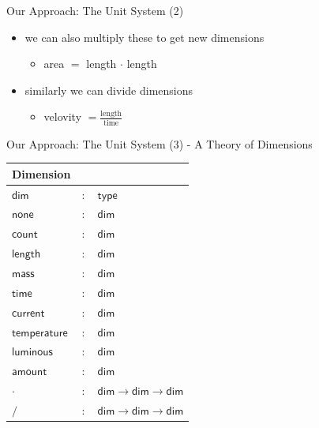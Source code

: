 \documentclass{beamer}
\begin{document}
  \begin{frame}{Our Approach: The Unit System (2)}
    \begin{itemize}[<+->]

      \item we can also multiply these to get new dimensions
      \begin{itemize}
        \item area $=$ length $\cdot{}$ length
      \end{itemize}

      \item similarly we can divide dimensions
      \begin{itemize}
        \item velovity $= \frac{\text{length}}{\text{time}}$
      \end{itemize}
    \end{itemize}
  \end{frame}
  \begin{frame}{Our Approach: The Unit System (3) - A Theory of Dimensions}
    \begin{center}
      \begin{tabular}{|l l l|}
        \hline
        \textsf{Dimension} & &\\\hline
        $\mathsf{dim}$ & $:$ & $ \mathsf{type}$\\

        $\mathsf{none}$ & $:$ & $ \mathsf{dim}$\\
        $\mathsf{count}$ & $:$ & $ \mathsf{dim}$\\
        $\mathsf{length}$ & $:$ & $ \mathsf{dim}$\\
        $\mathsf{mass}$ & $:$ & $ \mathsf{dim}$\\
        $\mathsf{time}$ & $:$ & $ \mathsf{dim}$\\
        $\mathsf{current}$ & $:$ & $ \mathsf{dim}$\\
        $\mathsf{temperature}$ & $:$ & $ \mathsf{dim}$\\
        $\mathsf{luminous}$ & $:$ & $ \mathsf{dim}$\\
        $\mathsf{amount}$ & $:$ & $ \mathsf{dim}$\\

        $\cdot{}$ & $:$ & $ \mathsf{dim} \rightarrow \mathsf{dim} \rightarrow \mathsf{dim}$\\
        $/$ & $:$ & $ \mathsf{dim} \rightarrow \mathsf{dim} \rightarrow \mathsf{dim}$\\\hline
      \end{tabular}
  \end{center}
\end{frame}
\end{document}
